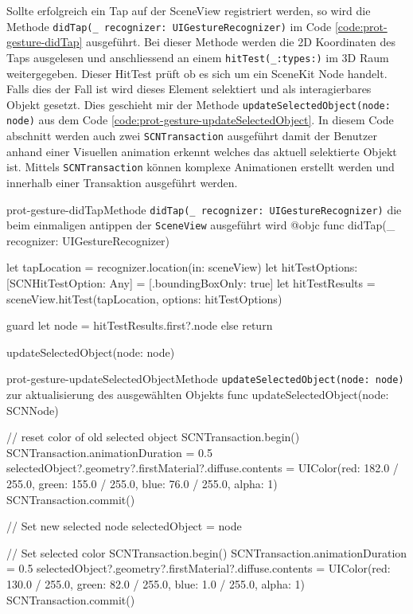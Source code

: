 \begin{description}
    Sollte erfolgreich ein Tap auf der SceneView registriert werden, so wird die Methode \texttt{didTap(\_ recognizer: UIGestureRecognizer)} im Code \ref{code:prot-gesture-didTap} ausgeführt. Bei dieser Methode werden die 2D Koordinaten des Taps ausgelesen und anschliessend an einem \texttt{hitTest(\_:types:)} im 3D Raum weitergegeben. Dieser HitTest prüft ob es sich um ein SceneKit Node handelt. Falls dies der Fall ist wird dieses Element selektiert und als interagierbares Objekt gesetzt. Dies geschieht mir der Methode \texttt{updateSelectedObject(node: node)} aus dem Code \ref{code:prot-gesture-updateSelectedObject}. In diesem Code abschnitt werden auch zwei \texttt{SCNTransaction} ausgeführt damit der Benutzer anhand einer Visuellen animation erkennt welches das aktuell selektierte Objekt ist. Mittels \texttt{SCNTransaction} können komplexe Animationen erstellt werden und innerhalb einer Transaktion ausgeführt werden.

    \begin{code}{prot-gesture-didTap}{Methode \texttt{didTap(\_ recognizer: UIGestureRecognizer)} die beim einmaligen antippen der \texttt{SceneView} ausgeführt wird}
    @objc
    func didTap(_ recognizer: UIGestureRecognizer) {
        let tapLocation = recognizer.location(in: sceneView)
        let hitTestOptions: [SCNHitTestOption: Any] = [.boundingBoxOnly: true]
        let hitTestResults = sceneView.hitTest(tapLocation, options: hitTestOptions)

        guard let node = hitTestResults.first?.node else {return}
        
        updateSelectedObject(node: node)
    }
    \end{code}

    \begin{code}{prot-gesture-updateSelectedObject}{Methode \texttt{updateSelectedObject(node: node)} zur aktualisierung des ausgewählten Objekts}
    func updateSelectedObject(node: SCNNode) {
        // reset color of old selected object
        SCNTransaction.begin()
        SCNTransaction.animationDuration = 0.5
        selectedObject?.geometry?.firstMaterial?.diffuse.contents = UIColor(red: 182.0 / 255.0, green: 155.0 / 255.0, blue: 76.0 / 255.0, alpha: 1)
        SCNTransaction.commit()
        
        // Set new selected node
        selectedObject = node
        
        // Set selected color
        SCNTransaction.begin()
        SCNTransaction.animationDuration = 0.5
        selectedObject?.geometry?.firstMaterial?.diffuse.contents = UIColor(red: 130.0 / 255.0, green: 82.0 / 255.0, blue: 1.0 / 255.0, alpha: 1)
        SCNTransaction.commit()
    }
    \end{code}


\end{description}
